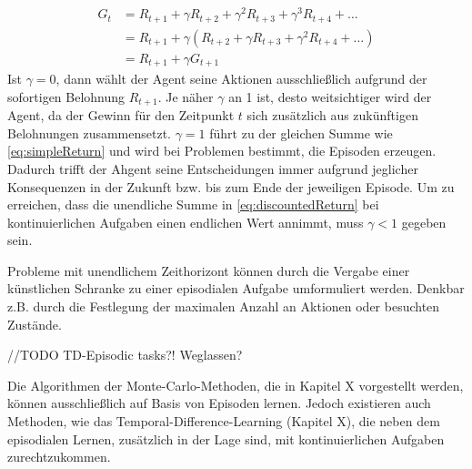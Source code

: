 \begin{equation}\label{eq:successiveReturn}
    \begin{aligned}
    G_t &= R_{t+1} + \gamma R_{t+2} + \gamma^2 R_{t+3} + \gamma^3 R_{t+4} + \dots \\
    &= R_{t+1} + \gamma (R_{t+2} + \gamma R_{t+3} + \gamma^2 R_{t+4} + \dots)  \\
   & = R_{t+1} + \gamma G_{t+1}
    \end{aligned}
\end{equation}
Ist $\gamma = 0$, dann wählt der Agent seine Aktionen ausschließlich aufgrund der sofortigen Belohnung $R_{t+1}$. Je näher $\gamma$ an 1 ist, desto \glqq weitsichtiger\grqq{} wird der Agent, da der Gewinn für den Zeitpunkt $t$ sich zusätzlich aus zukünftigen Belohnungen zusammensetzt. $\gamma = 1$ führt zu der gleichen Summe wie \eqref{eq:simpleReturn} und wird bei Problemen bestimmt, die Episoden erzeugen. Dadurch trifft der Ahgent seine Entscheidungen immer aufgrund jeglicher Konsequenzen in der Zukunft bzw. bis zum Ende der jeweiligen Episode. Um zu erreichen, dass die unendliche Summe in \eqref{eq:discountedReturn} bei kontinuierlichen Aufgaben einen endlichen Wert annimmt, muss $\gamma < 1$ gegeben sein.
\par 
Probleme mit unendlichem Zeithorizont können durch die Vergabe einer künstlichen Schranke zu einer episodialen Aufgabe umformuliert werden. Denkbar z.B. durch die Festlegung der maximalen Anzahl an Aktionen oder besuchten Zustände. 
\par 
//TODO TD-Episodic tasks?! Weglassen?
\par
Die Algorithmen der Monte-Carlo-Methoden, die in Kapitel X vorgestellt werden, können ausschließlich auf Basis von Episoden lernen. Jedoch existieren auch Methoden, wie das Temporal-Difference-Learning (Kapitel X), die neben dem episodialen Lernen, zusätzlich in der Lage sind, mit kontinuierlichen Aufgaben zurechtzukommen. 